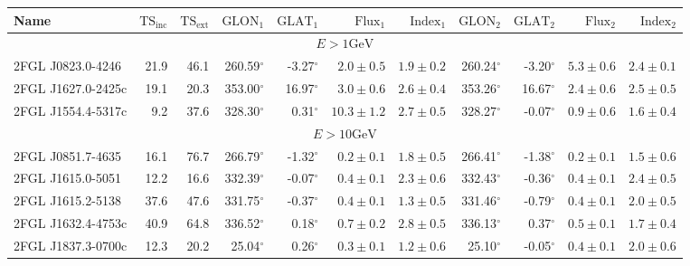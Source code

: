 \documentclass[12pt,preprint]{aastex}
\newcommand{\gev}{\text{GeV}\xspace}
\newcommand{\tsext}{{\ensuremath{\text{TS}_\text{ext}}}\xspace}
\newcommand{\tsinc}{\ensuremath{\text{TS}_\text{inc}}\xspace}
\newcommand{\glon}{\text{GLON}\xspace}
\newcommand{\glat}{\text{GLAT}\xspace}
\renewcommand{\deg}{\ensuremath{^\circ}\xspace}
\begin{document}
\clearpage
\begin{table}
    \begin{centering}
      \begin{tabular}{l|rr|rrrr|rrrr}
        \hline
        \hline
        Name                 &     \tsinc &     \tsext &      $\glon_1$ &      $\glat_1$ &   $\text{Flux}_1$ &   $\text{Index}_1$ &      $\glon_2$ &      $\glat_2$ &   $\text{Flux}_2$ &  $\text{Index}_2$ \\
        \hline
        \multicolumn{11}{c}{$E > 1 \gev$} \\
        \hline
        2FGL J0823.0-4246    &       21.9 &       46.1 &     260.59\deg &      -3.27\deg & $       2.0 \pm        0.5$ & $  1.9 \pm   0.2$  &     260.24\deg &      -3.20\deg & $       5.3 \pm        0.6$ & $  2.4 \pm   0.1$ \\
        2FGL J1627.0-2425c   &       19.1 &       20.3 &     353.00\deg &      16.97\deg & $       3.0 \pm        0.6$ & $  2.6 \pm   0.4$  &     353.26\deg &      16.67\deg & $       2.4 \pm        0.6$ & $  2.5 \pm   0.5$ \\
        2FGL J1554.4-5317c   &        9.2 &       37.6 &     328.30\deg &       0.31\deg & $      10.3 \pm        1.2$ & $  2.7 \pm   0.5$  &     328.27\deg &      -0.07\deg & $       0.9 \pm        0.6$ & $  1.6 \pm   0.4$ \\
        \hline
        \multicolumn{11}{c}{$E > 10 \gev$} \\
        \hline
        2FGL J0851.7-4635    &       16.1 &       76.7 &     266.79\deg &      -1.32\deg & $       0.2 \pm        0.1$ & $  1.8 \pm   0.5$  &     266.41\deg &      -1.38\deg & $       0.2 \pm        0.1$ & $  1.5 \pm   0.6$ \\
        2FGL J1615.0-5051    &       12.2 &       16.6 &     332.39\deg &      -0.07\deg & $       0.4 \pm        0.1$ & $  2.3 \pm   0.6$  &     332.43\deg &      -0.36\deg & $       0.4 \pm        0.1$ & $  2.4 \pm   0.5$ \\
        2FGL J1615.2-5138    &       37.6 &       47.6 &     331.75\deg &      -0.37\deg & $       0.4 \pm        0.1$ & $  1.3 \pm   0.5$  &     331.46\deg &      -0.79\deg & $       0.4 \pm        0.1$ & $  2.0 \pm   0.5$ \\
        2FGL J1632.4-4753c   &       40.9 &       64.8 &     336.52\deg &       0.18\deg & $       0.7 \pm        0.2$ & $  2.8 \pm   0.5$  &     336.13\deg &       0.37\deg & $       0.5 \pm        0.1$ & $  1.7 \pm   0.4$ \\
        2FGL J1837.3-0700c   &       12.3 &       20.2 &      25.04\deg &       0.26\deg & $       0.3 \pm        0.1$ & $  1.2 \pm   0.6$  &      25.10\deg &      -0.05\deg & $       0.4 \pm        0.1$ & $  2.0 \pm   0.6$ \\

\end{tabular}
\end{centering}
\end{table}
\end{document}
